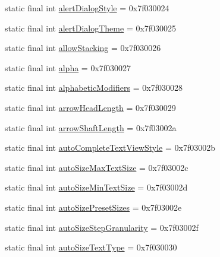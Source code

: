 \begin{DoxyCompactItemize}
\item 
static final int \mbox{\hyperlink{classandroid_1_1support_1_1design_1_1R_1_1attr_a243018b6844b3078db89b7739f73fc13}{alert\+Dialog\+Style}} = 0x7f030024
\item 
static final int \mbox{\hyperlink{classandroid_1_1support_1_1design_1_1R_1_1attr_a544216476a21a3edafffc422db18bf9f}{alert\+Dialog\+Theme}} = 0x7f030025
\item 
static final int \mbox{\hyperlink{classandroid_1_1support_1_1design_1_1R_1_1attr_a7765cc0f9b1bd3b722ad66fe69e34ced}{allow\+Stacking}} = 0x7f030026
\item 
static final int \mbox{\hyperlink{classandroid_1_1support_1_1design_1_1R_1_1attr_a4cb2639e62dfbced7fb3335e94681ba0}{alpha}} = 0x7f030027
\item 
static final int \mbox{\hyperlink{classandroid_1_1support_1_1design_1_1R_1_1attr_a0ca32622f7143f20147727db88acb2ec}{alphabetic\+Modifiers}} = 0x7f030028
\item 
static final int \mbox{\hyperlink{classandroid_1_1support_1_1design_1_1R_1_1attr_a1c5413c1d098f1dedeec52bf1f60bbd4}{arrow\+Head\+Length}} = 0x7f030029
\item 
static final int \mbox{\hyperlink{classandroid_1_1support_1_1design_1_1R_1_1attr_a5173098b8b4a2a042d1dc65c0726feb4}{arrow\+Shaft\+Length}} = 0x7f03002a
\item 
static final int \mbox{\hyperlink{classandroid_1_1support_1_1design_1_1R_1_1attr_a7b3906d45193c214e16185415dde30b0}{auto\+Complete\+Text\+View\+Style}} = 0x7f03002b
\item 
static final int \mbox{\hyperlink{classandroid_1_1support_1_1design_1_1R_1_1attr_a592b4d4333dd68b09348090b3b33c518}{auto\+Size\+Max\+Text\+Size}} = 0x7f03002c
\item 
static final int \mbox{\hyperlink{classandroid_1_1support_1_1design_1_1R_1_1attr_ac5176518a95620dc64f13b219fce66f1}{auto\+Size\+Min\+Text\+Size}} = 0x7f03002d
\item 
static final int \mbox{\hyperlink{classandroid_1_1support_1_1design_1_1R_1_1attr_a642cd88b82964b4ef57642f6d72f99cf}{auto\+Size\+Preset\+Sizes}} = 0x7f03002e
\item 
static final int \mbox{\hyperlink{classandroid_1_1support_1_1design_1_1R_1_1attr_ad7439f128e025029578dbe3e80250846}{auto\+Size\+Step\+Granularity}} = 0x7f03002f
\item 
static final int \mbox{\hyperlink{classandroid_1_1support_1_1design_1_1R_1_1attr_a7bb4c8381e9cfab8b4dc317a93106688}{auto\+Size\+Text\+Type}} = 0x7f030030

\end{DoxyCompactItemize}
